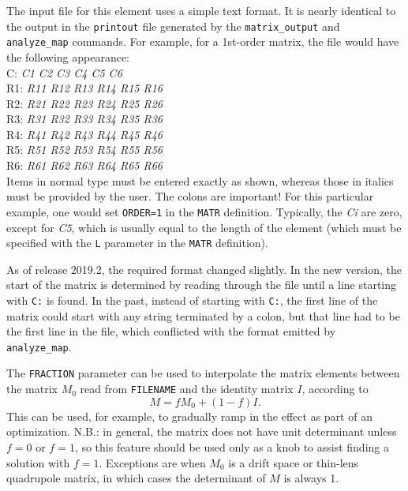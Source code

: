 The input file for this element uses a simple text format.  It is nearly identical
to the output in the {\tt printout} file generated by the {\tt matrix\_output}
and {\tt analyze\_map} commands.  For example, for a 1st-order matrix, the file would have the
following appearance:\\
C: {\em C1 C2 C3 C4 C5 C6}\\
R1: {\em R11 R12 R13 R14 R15 R16}\\
R2: {\em R21 R22 R23 R24 R25 R26}\\
R3: {\em R31 R32 R33 R34 R35 R36}\\
R4: {\em R41 R42 R43 R44 R45 R46}\\
R5: {\em R51 R52 R53 R54 R55 R56}\\
R6: {\em R61 R62 R63 R64 R65 R66}\\

Items in normal type must be entered exactly as shown, whereas those in
italics must be provided by the user.  The colons are important!
For this particular example, one would set {\tt ORDER=1} in the {\tt MATR}
definition.  Typically, the {\em Ci} are zero, except for {\em C5}, which
is usually equal to the length of the element (which must be specified with
the {\tt L} parameter in the {\tt MATR} definition).

As of release 2019.2, the required format changed slightly. 
In the new version, the start of the matrix is determined by reading through the file until 
a line starting with \verb|C:| is found.
In the past, 
instead of starting with \verb|C:|, the first line of the matrix could start
with any string terminated by a colon, but that line had to be the first line in the
file, which conflicted with the format emitted by \verb|analyze_map|.

The \verb|FRACTION| parameter can be used to interpolate the matrix elements between the
matrix $M_0$ read from \verb|FILENAME| and the identity matrix $I$, according to
\begin{equation}
M = fM_0 + (1-f)I.
\end{equation}
This can be used, for example, to gradually ramp in the effect as part of an optimization.
N.B.: in general, the matrix does not have unit determinant unless $f=0$ or $f=1$, so this 
feature should be used only as a knob to assist finding a solution with $f=1$.
Exceptions are when $M_0$ is a drift space or thin-lens quadrupole matrix, in which cases
the determinant of $M$ is always 1.



